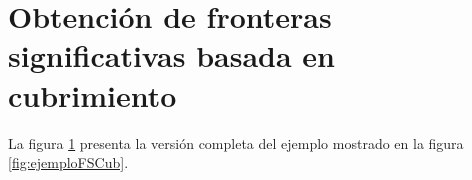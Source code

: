 \section{Obtención de fronteras significativas basada en cubrimiento}\label{EXE:sfbc}
La figura \ref{EXE:sfbc} presenta la versión completa del ejemplo mostrado en la figura \ref{fig:ejemploFSCub}.
\endgroup
\begin{figure}[H]
  \centerfloat


\end{figure}
